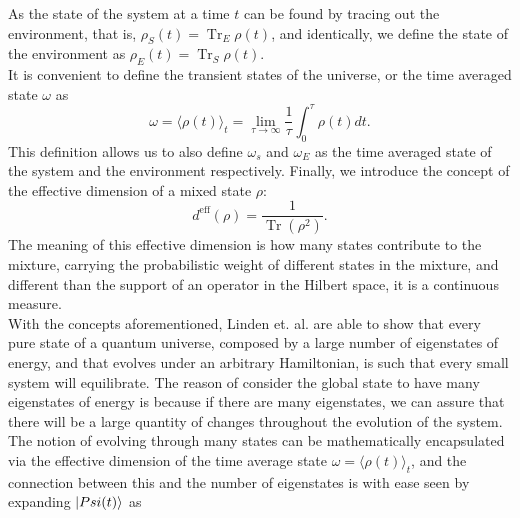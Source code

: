 As the state of the system at a time $t$ can be found by tracing out the environment, that is, $\rho_S(t)=\operatorname{Tr}_E \rho(t)$, and identically, we define the state of the environment as $\rho_E(t)=\operatorname{Tr}_S \rho(t)$.\\
\indent It is convenient to define the transient states of the universe, or the time averaged state $\omega$ as
\begin{equation}
\omega=\langle\rho(t)\rangle_{t}=\lim _{\tau \rightarrow \infty} \frac{1}{\tau} \int_{0}^{\tau} \rho(t) d t.
\label{CH1:average_time_state}
\end{equation}
This definition allows us to also define $\omega_s$ and $\omega_E$ as the time averaged state of the system and the environment respectively. Finally, we introduce the concept of the effective dimension of a mixed state $\rho$:
\begin{equation}
d^{\mathrm{eff}}(\rho)=\frac{1}{\operatorname{Tr}\left(\rho^{2}\right)}.
\label{CH1:Effective_dimension}
\end{equation}
The meaning of this effective dimension is how many states contribute to the mixture, carrying the probabilistic weight of different states in the mixture, and different than the support of an operator in the Hilbert space, it is a continuous measure.\\
\indent With the concepts aforementioned, Linden et. al.  \cite{linden_quantum_2009} are able to show that every pure state of a quantum universe, composed by a large number of eigenstates of energy, and that evolves under an arbitrary Hamiltonian, is such that every small system will equilibrate. The reason of consider the global state to have many eigenstates of energy is because if there are many eigenstates, we can assure that there will be a large quantity of changes throughout the evolution of the system. The notion of evolving through many states can be mathematically encapsulated via the effective dimension of the time average state $\omega=\langle\rho(t)\rangle_{t}$, and the connection between this and the number of eigenstates is with ease seen by expanding $\mathinner{|{Psi(t)}\rangle}$ as

